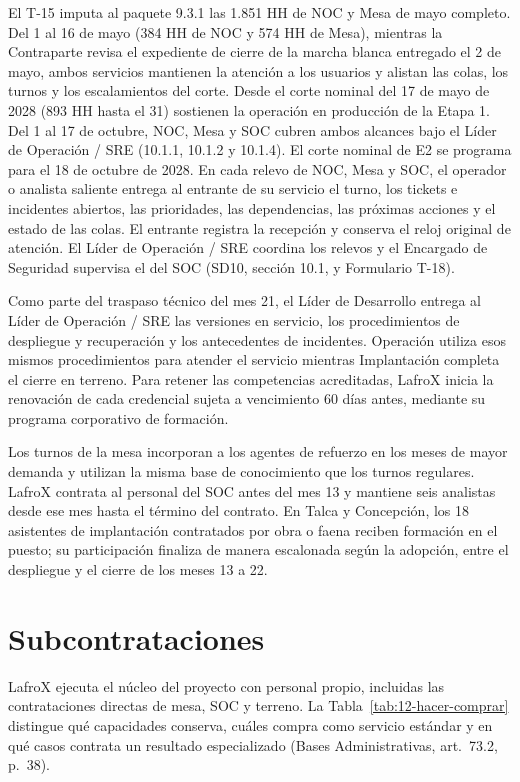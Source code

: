 El T-15 imputa al paquete 9.3.1 las 1.851 HH de NOC y Mesa de mayo completo. Del 1 al 16 de mayo (384 HH de NOC y 574 HH de Mesa), mientras la Contraparte revisa el expediente de cierre de la marcha blanca entregado el 2 de mayo, ambos servicios mantienen la atención a los usuarios y alistan las colas, los turnos y los escalamientos del corte. Desde el corte nominal del 17 de mayo de 2028 (893 HH hasta el 31) sostienen la operación en producción de la Etapa 1. Del 1 al 17 de octubre, NOC, Mesa y SOC cubren ambos alcances bajo el Líder de Operación / SRE (10.1.1, 10.1.2 y 10.1.4). El corte nominal de E2 se programa para el 18 de octubre de 2028. En cada relevo de NOC, Mesa y SOC, el operador o analista saliente entrega al entrante de su servicio el turno, los tickets e incidentes abiertos, las prioridades, las dependencias, las próximas acciones y el estado de las colas. El entrante registra la recepción y conserva el reloj original de atención. El Líder de Operación / SRE coordina los relevos y el Encargado de Seguridad supervisa el del SOC (SD10, sección 10.1, y Formulario T-18).

Como parte del traspaso técnico del mes 21, el Líder de Desarrollo entrega al Líder de Operación / SRE las versiones en servicio, los procedimientos de despliegue y recuperación y los antecedentes de incidentes. Operación utiliza esos mismos procedimientos para atender el servicio mientras Implantación completa el cierre en terreno. Para retener las competencias acreditadas, LafroX inicia la renovación de cada credencial sujeta a vencimiento 60 días antes, mediante su programa corporativo de formación.

Los turnos de la mesa incorporan a los agentes de refuerzo en los meses de mayor demanda y utilizan la misma base de conocimiento que los turnos regulares. LafroX contrata al personal del SOC antes del mes 13 y mantiene seis analistas desde ese mes hasta el término del contrato. En Talca y Concepción, los 18 asistentes de implantación contratados por obra o faena reciben formación en el puesto; su participación finaliza de manera escalonada según la adopción, entre el despliegue y el cierre de los meses 13 a 22.

\section{Subcontrataciones}

LafroX ejecuta el núcleo del proyecto con personal propio, incluidas las contrataciones directas de mesa, SOC y terreno. La Tabla~\ref{tab:12-hacer-comprar} distingue qué capacidades conserva, cuáles compra como servicio estándar y en qué casos contrata un resultado especializado (Bases Administrativas, art.~73.2, p.~38).

